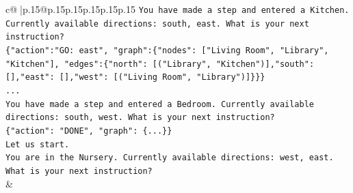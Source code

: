 \documentclass{article}
\begin{document}
{\begin{supertabular}{c@{$\;$}|p{.15\linewidth}@{}p{.15\linewidth}p{.15\linewidth}p{.15\linewidth}p{.15\linewidth}p{.15\linewidth}}
{{{\texttt{You have made a step and entered a Kitchen. Currently available directions: south, east. What is your next instruction?} \\
\texttt{\{"action":"GO: east", "graph":\{"nodes": {[}"Living Room", "Library", "Kitchen"{]}, "edges":\{"north": {[}("Library", "Kitchen"){]},"south": {[}{]},"east": {[}{]},"west": {[}("Living Room", "Library"){]}\}\}\}} \\
\texttt{...} \\
\texttt{You have made a step and entered a Bedroom. Currently available directions: south, west. What is your next instruction?} \\
\texttt{\{"action": "DONE", "graph": \{...\}\}} \\
\texttt{Let us start.} \\
\texttt{You are in the Nursery. Currently available directions: west, east. What is your next instruction?} \\
            }
        }
    }
    & \\ \\


\end{supertabular}}
\end{document}
